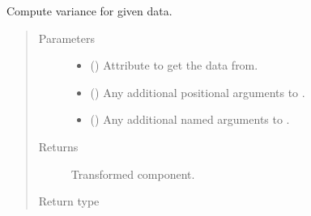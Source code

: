 \documentclass[letterpaper,10pt,english]{sphinxmanual}
\begin{document}
\begin{fulllineitems}
\begin{fulllineitems}
\begin{quote}
\begin{description}
\end{description}\end{quote}

\end{fulllineitems}


\begin{fulllineitems}
\label{\detokenize{api/rock:geology.src.Rock.variance}}
Compute variance for given data.
\begin{quote}\begin{description}
\item[{Parameters}] \leavevmode\begin{itemize}
\item {} 
 (\sphinxstyleliteralemphasis{\sphinxupquote{, }}) \textendash{} Attribute to get the data from.

\item {} 
 () \textendash{} Any additional positional arguments to .

\item {} 
 () \textendash{} Any additional named arguments to .

\end{itemize}

\item[{Returns}] \leavevmode
{} \textendash{} Transformed component.

\item[{Return type}] \leavevmode
{\hyperref[\detokenize{api/base_classes:geology.src.base_spatial.SpatialComponent}]{}}

\end{description}\end{quote}

\end{fulllineitems}


\end{fulllineitems}
\end{document}
